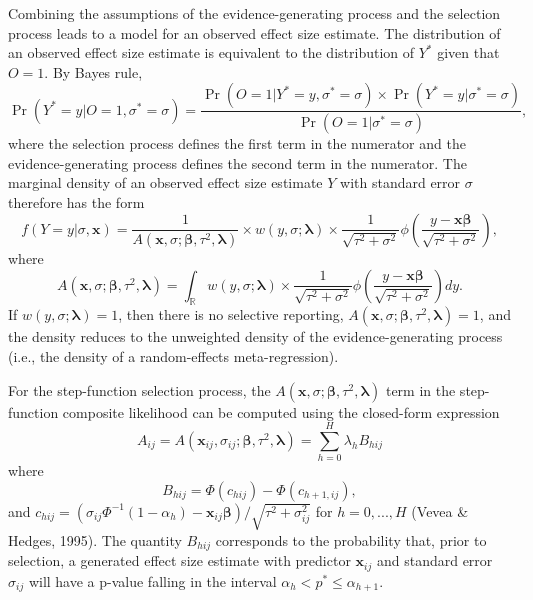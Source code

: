 \documentclass[
  american,
  man, donotrepeattitle,floatsintext]{apa7}
\begin{document}
Combining the assumptions of the evidence-generating process and the selection process leads to a model for an observed effect size estimate. The distribution of an observed effect size estimate is equivalent to the distribution of \(Y^*\) given that \(O = 1\). By Bayes rule,
\[
\Pr(Y^* = y | O = 1, \sigma^* = \sigma) = \frac{\Pr(O = 1 | Y^* = y, \sigma^* = \sigma) \times \Pr(Y^* = y | \sigma^* = \sigma)}{\Pr(O = 1 | \sigma^* = \sigma)},
\]
where the selection process defines the first term in the numerator and the evidence-generating process defines the second term in the numerator. The marginal density of an observed effect size estimate \(Y\) with standard error \(\sigma\) therefore has the form
\begin{equation}
\label{eq:generic-selection}
f(Y = y | \sigma, \mathbf{x}) = \frac{1}{A(\mathbf{x}, \sigma; \boldsymbol\beta, \tau^2, \boldsymbol\lambda)} \times w\left(y, \sigma; \boldsymbol\lambda \right) \times \frac{1}{\sqrt{\tau^2 + \sigma^2}} \phi\left(\frac{y - \mathbf{x} \boldsymbol\beta}{\sqrt{\tau^2 + \sigma^2}}\right),
\end{equation}
where
\begin{equation}
\label{eq:generic-selection-A}
A(\mathbf{x}, \sigma; \boldsymbol\beta, \tau^2, \boldsymbol\lambda) =  \int_\mathbb{R} w\left(y, \sigma; \boldsymbol\lambda \right) \times  \frac{1}{\sqrt{\tau^2 + \sigma^2}}\phi\left(\frac{y - \mathbf{x}\boldsymbol\beta}{\sqrt{\tau^2 + \sigma^2}}\right) dy.
\end{equation}
If \(w(y, \sigma; \boldsymbol\lambda) = 1\), then there is no selective reporting, \(A(\mathbf{x}, \sigma; \boldsymbol\beta, \tau^2, \boldsymbol\lambda) = 1\), and the density reduces to the unweighted density of the evidence-generating process (i.e., the density of a random-effects meta-regression).

For the step-function selection process, the \(A(\mathbf{x}, \sigma; \boldsymbol\beta, \tau^2, \boldsymbol\lambda)\) term in the step-function composite likelihood can be computed using the closed-form expression
\begin{equation}
\label{eq:step-function-A}
A_{ij} = A(\mathbf{x}_{ij}, \sigma_{ij}; \boldsymbol\beta, \tau^2, \boldsymbol\lambda) = \sum_{h=0}^H \lambda_h B_{hij}
\end{equation}
where
\begin{equation}
\label{eq:step-function-Bhij}
B_{hij} = \Phi\left(c_{hij}\right) - \Phi\left(c_{h+1,ij}\right),
\end{equation}
and \(c_{hij} = \left(\sigma_{ij} \Phi^{-1}\left(1 - \alpha_h\right) - \mathbf{x}_{ij}\boldsymbol\beta\right) / \sqrt{\tau^2 + \sigma_{ij}^2}\) for \(h = 0,...,H\) (Vevea \& Hedges, 1995).
The quantity \(B_{hij}\) corresponds to the probability that, prior to selection, a generated effect size estimate with predictor \(\mathbf{x}_{ij}\) and standard error \(\sigma_{ij}\) will have a p-value falling in the interval \(\alpha_h < p^* \leq \alpha_{h+1}\).
\end{document}
